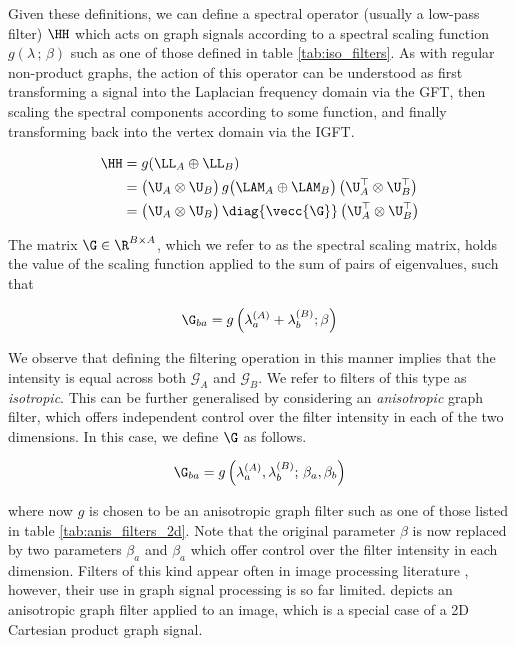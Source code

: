 Given these definitions, we can define a spectral operator (usually a low-pass filter) $\HH$ which acts on graph signals according to a spectral scaling function $g(\lambda \,; \, \beta)$ such as one of those defined in table \ref{tab:iso_filters}. As with regular non-product graphs, the action of this operator can be understood as first transforming a signal into the Laplacian frequency domain via the GFT, then scaling the spectral components according to some function, and finally transforming back into the vertex domain via the IGFT.

\begin{align}
    \label{eq:graph_filter}
    \HH & = g(\LL_A \oplus \LL_B) \notag                                                                                          \\
        & = \big( \U_A \otimes \U_B \big) \, g \big( \LAM_A \oplus \LAM_B \big) \, \big( \U_A^\top \otimes \U_B^\top \big) \notag \\
        & = \big( \U_A \otimes \U_B \big) \, \diag{\vecc{\G}} \, \big( \U_A^\top \otimes \U_B^\top \big)
\end{align}


The matrix $\G \in \R^{B \times A}$, which we refer to as the spectral scaling matrix, holds the value of the scaling function applied to the sum of
pairs of eigenvalues, such that

\begin{equation}
    \label{eq:Gba}
    \G_{ba} = g\left(\lambda^{(A)}_a + \lambda^{(B)}_b; \beta\right)
\end{equation}



We observe that defining the filtering operation in this manner implies that the intensity is equal across both $\mathcal{G}_A$ and $\mathcal{G}_B$. We refer to filters of this type as \textit{isotropic}. This can be further generalised by considering an \textit{anisotropic} graph filter, which offers independent control over the filter intensity in each of the two dimensions. In this case, we define $\G$ as follows.

\begin{equation}
    \label{eq:Gba2}
    \G_{ba} =  g \left(\lambda^{(A)}_a, \lambda^{(B)}_b; \, \beta_a, \beta_b\right)
\end{equation}

where now $g$ is chosen to be an anisotropic graph filter such as one of those listed in table \ref{tab:anis_filters_2d}. Note that the original parameter $\beta$ is now replaced by two parameters $\beta_a$ and $\beta_a$ which offer control over the filter intensity in each dimension. Filters of this kind appear often in image processing literature \citep{Aubert2006}, however, their use in graph signal processing is so far limited.  depicts an anisotropic graph filter applied to an image, which is a special case of a 2D Cartesian product graph signal.  


